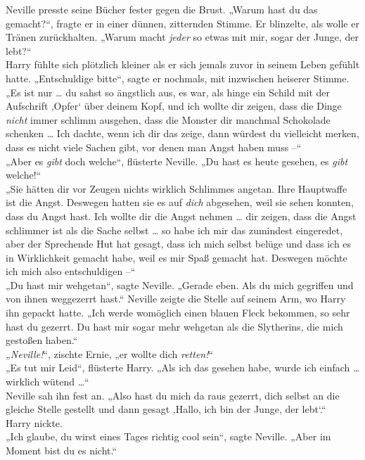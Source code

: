 {Neville presste seine Bücher fester gegen die Brust. „Warum hast du das gemacht?“, fragte er in einer dünnen, zitternden Stimme. Er blinzelte, als wolle er Tränen zurückhalten. „Warum macht \emph{jeder} so etwas mit mir, sogar der Junge, der lebt?“\\ Harry fühlte sich plötzlich kleiner als er sich jemals zuvor in seinem Leben gefühlt hatte. „Entschuldige bitte“, sagte er nochmals, mit inzwischen heiserer Stimme. „Es ist nur … du sahst so ängstlich aus, es war, als hinge ein Schild mit der Aufschrift ‚Opfer` über deinem Kopf, und ich wollte dir zeigen, dass die Dinge \emph{nicht} immer schlimm ausgehen, dass die Monster dir manchmal Schokolade schenken … Ich dachte, wenn ich dir das zeige, dann würdest du vielleicht merken, dass es nicht viele Sachen gibt, vor denen man Angst haben muss --“\\ „Aber es \emph{gibt} doch welche“, flüsterte Neville. „Du hast es heute gesehen, es \emph{gibt} welche!“\\ „Sie hätten dir vor Zeugen nichts wirklich Schlimmes angetan. Ihre Hauptwaffe ist die Angst. Deswegen hatten sie es auf \emph{dich} abgesehen, weil sie sehen konnten, dass du Angst hast. Ich wollte dir die Angst nehmen … dir zeigen, dass die Angst schlimmer ist als die Sache selbst … so habe ich mir das zumindest eingeredet, aber der Sprechende Hut hat gesagt, dass ich mich selbst belüge und dass ich es in Wirklichkeit gemacht habe, weil es mir Spaß gemacht hat. Deswegen möchte ich mich also entschuldigen --“\\ „Du hast mir wehgetan“, sagte Neville. „Gerade eben. Als du mich gegriffen und von ihnen weggezerrt hast.“ Neville zeigte die Stelle auf seinem Arm, wo Harry ihn gepackt hatte. „Ich werde womöglich einen blauen Fleck bekommen, so sehr hast du gezerrt. Du hast mir sogar mehr wehgetan als die Slytherins, die mich gestoßen haben.“\\ \emph{„Neville!}“, zischte Ernie, „er wollte dich \emph{retten!}“\\ „Es tut mir Leid“, flüsterte Harry. „Als ich das gesehen habe, wurde ich einfach … wirklich wütend …“\\ Neville sah ihn fest an. „Also hast du mich da raus gezerrt, dich selbst an die gleiche Stelle gestellt und dann gesagt ‚Hallo, ich bin der Junge, der lebt`.“\\ Harry nickte.\\ „Ich glaube, du wirst eines Tages richtig cool sein“, sagte Neville. „Aber im Moment bist du es nicht.“

}
